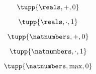 {\begin{forslides}
        
        \begin{equation}
            \label{eq:example-monoid-reals-plus-zero}
            \tupp{\reals, +, 0}
        \end{equation}
        
        \begin{equation}
            \label{eq:example-monoid-reals-mult-one}
            \tupp{\reals, \cdot, 1}
        \end{equation}
        
        
        \begin{equation}
            \label{eq:example-monoid-nats-plus-zero}
            \tupp{\natnumbers, +, 0}
        \end{equation}
        
        \begin{equation}
            \label{eq:example-monoid-nats-mult-one}
            \tupp{\natnumbers, \cdot, 1}
        \end{equation}
        
        
        \begin{equation}
            \label{eq:example-monoid-nats-max-zero}
            \tupp{\natnumbers, \max, 0}
        \end{equation}
    \end{forslides}
}
